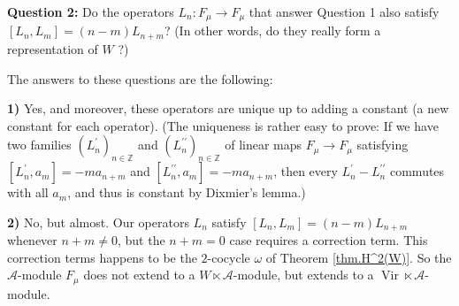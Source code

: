 \documentclass
[numbers=enddot,12pt,final,onecolumn,german,notitlepage]{scrartcl}%
\theoremstyle{definition}
\begin{document}
\textbf{Question 2:} Do the operators $L_{n}:F_{\mu}\rightarrow F_{\mu}$ that
answer Question 1 also satisfy $\left[  L_{n},L_{m}\right]  =\left(
n-m\right)  L_{n+m}$? (In other words, do they really form a representation of
$W$ ?)

The answers to these questions are the following:

\textbf{1)} Yes, and moreover, these operators are unique up to adding a
constant (a new constant for each operator). (The uniqueness is rather easy to
prove: If we have two families $\left(  L_{n}^{\prime}\right)  _{n\in
\mathbb{Z}}$ and $\left(  L_{n}^{\prime\prime}\right)  _{n\in\mathbb{Z}}$ of
linear maps $F_{\mu}\rightarrow F_{\mu}$ satisfying $\left[  L_{n}^{\prime
},a_{m}\right]  =-ma_{n+m}$ and $\left[  L_{n}^{\prime\prime},a_{m}\right]
=-ma_{n+m}$, then every $L_{n}^{\prime}-L_{n}^{\prime\prime}$ commutes with
all $a_{m}$, and thus is constant by Dixmier's lemma.)

\textbf{2)} No, but almost. Our operators $L_{n}$ satisfy $\left[  L_{n}%
,L_{m}\right]  =\left(  n-m\right)  L_{n+m}$ whenever $n+m\neq0$, but the
$n+m=0$ case requires a correction term. This correction terms happens to be
the $2$-cocycle $\omega$ of Theorem \ref{thm.H^2(W)}. So the $\mathcal{A}%
$-module $F_{\mu}$ does not extend to a $W\ltimes\mathcal{A}$-module, but
extends to a $\operatorname*{Vir}\ltimes\mathcal{A}$-module.
\end{document}
